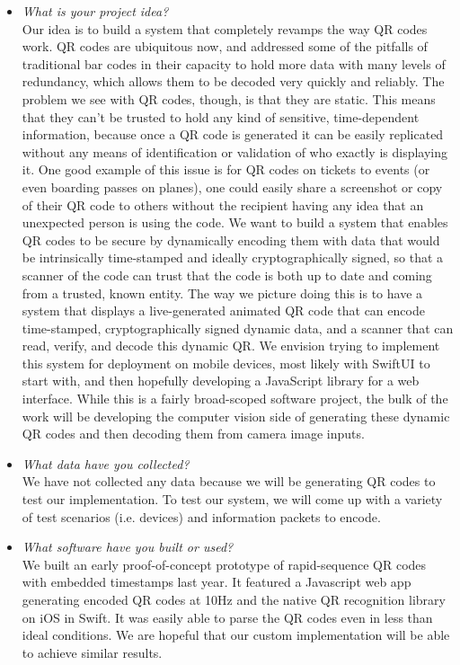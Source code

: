 \begin{itemize}
  \item \emph{What is your project idea?} \\ 
  Our idea is to build a system that completely revamps the way QR codes work. QR codes are ubiquitous now, and addressed some of the pitfalls of traditional bar codes in their capacity to hold more data with many levels of redundancy, which allows them to be decoded very quickly and reliably. The problem we see with QR codes, though, is that they are static. This means that they can’t be trusted to hold any kind of sensitive, time-dependent information, because once a QR code is generated it can be easily replicated without any means of identification or validation of who exactly is displaying it. One good example of this issue is for QR codes on tickets to events (or even boarding passes on planes), one could easily share a screenshot or copy of their QR code to others without the recipient having any idea that an unexpected person is using the code. We want to build a system that enables QR codes to be secure by dynamically encoding them with data that would be intrinsically time-stamped and ideally cryptographically signed, so that a scanner of the code can trust that the code is both up to date and coming from a trusted, known entity. The way we picture doing this is to have a system that displays a live-generated animated QR code that can encode time-stamped, cryptographically signed dynamic data, and a scanner that can read, verify, and decode this dynamic QR. We envision trying to implement this system for deployment on mobile devices, most likely with SwiftUI to start with, and then hopefully developing a JavaScript library for a web interface. While this is a fairly broad-scoped software project, the bulk of the work will be developing the computer vision side of generating these dynamic QR codes and then decoding them from camera image inputs.
  \item \emph{What data have you collected?} \\
  We have not collected any data because we will be generating QR codes to test our implementation. To test our system, we will come up with a variety of test scenarios (i.e. devices) and information packets to encode.
  \item \emph{What software have you built or used?} \\
  We built an early proof-of-concept prototype of rapid-sequence QR codes with embedded timestamps last year. It featured a Javascript web app generating encoded QR codes at 10Hz and the native QR recognition library on iOS in Swift. It was easily able to parse the QR codes even in less than ideal conditions. We are hopeful that our custom implementation will be able to achieve similar results.

\end{itemize}
